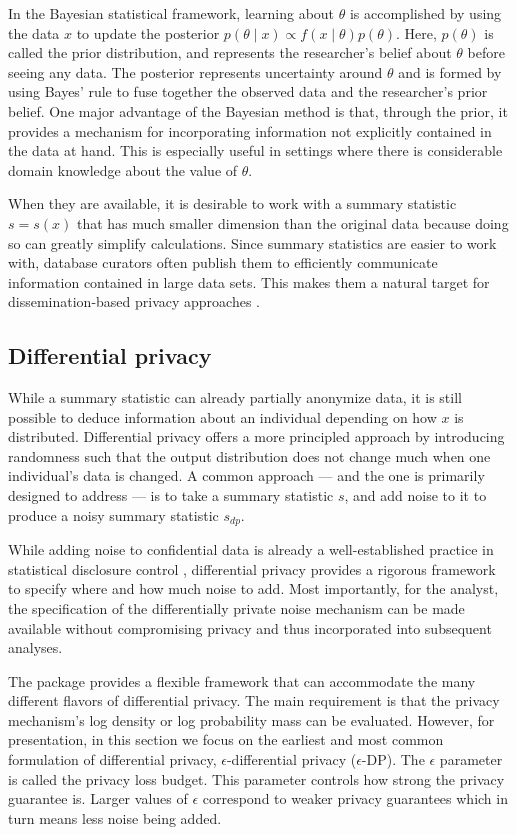 In the Bayesian statistical framework, learning about \(\theta\) is
accomplished by using the data \(x\) to update the
posterior \(p(\theta \mid x) \propto f(x \mid \theta) p(\theta)\).
Here, \(p(\theta)\) is called the prior distribution, and represents
the researcher's belief about \(\theta\) before seeing any data. The
posterior represents uncertainty around \(\theta\) and is formed by using Bayes' rule to fuse together the
observed data and the researcher's prior belief.
One major advantage of the Bayesian method is that, through the prior,
it provides a mechanism for incorporating information not explicitly contained
in the data at hand. This is especially useful in settings where there
is considerable domain knowledge about the value of \(\theta\).

When they are available, it is desirable to work with a summary statistic \(s = s(x)\)
that has much smaller dimension than the original data because doing so can
greatly simplify calculations. Since summary statistics are easier to work with,
database curators often publish them to efficiently communicate information
contained in large data sets.
This makes them a natural target for
dissemination-based privacy approaches \citep{Karr2016}.

\subsection{Differential privacy}\label{sec:dp}

While a summary statistic can already partially anonymize data, it is still
possible to deduce information about an individual depending on how \(x\) is distributed.
Differential privacy offers a more principled
approach by introducing randomness such that the output distribution
does not change much when one individual's data is changed. A common approach --- and the one 
is primarily designed to address ---
is to take a summary statistic \(s\), and add noise to it
to produce a noisy summary statistic \(s_{dp}\).

While adding noise to confidential data is already a well-established practice in statistical disclosure control \citep{Dalenius1982}, differential privacy
provides a rigorous framework to specify where and how much
noise to add.
Most importantly, for the analyst, the specification of the differentially private noise mechanism can
be made available without compromising privacy and thus incorporated into subsequent analyses.

The  package provides a flexible framework that can accommodate
the many different flavors of differential privacy. The main requirement is that
the privacy mechanism's log density or log probability mass can be evaluated.
However, for presentation,
in this section we focus on the earliest and most common
formulation of differential privacy, \(\epsilon\)-differential privacy (\(\epsilon\)-DP). The
\(\epsilon\) parameter is called the privacy loss budget. This parameter controls how
strong the privacy guarantee is. Larger values of \(\epsilon\) correspond to weaker
privacy guarantees which in turn means less noise being added.

